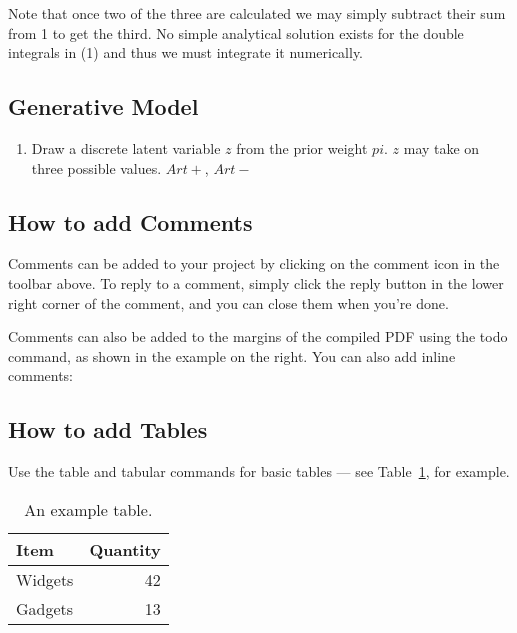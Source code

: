 \documentclass[a4paper]{article}
\begin{document}
Note that once two of the three are calculated we may simply subtract their sum from 1 to get the third. No simple analytical solution exists for the double integrals in (1) and thus we must integrate it numerically.

\subsection{Generative Model}

\begin{enumerate}
\item Draw a discrete latent variable $z$ from the prior weight $pi$. $z$ may take on three possible values. $Art+$, $Art-$
\end{enumerate}





\subsection{How to add Comments}

Comments can be added to your project by clicking on the comment icon in the toolbar above. %
%
%
To reply to a comment, simply click the reply button in the lower right corner of the comment, and you can close them when you're done.

Comments can also be added to the margins of the compiled PDF using the todo command, as shown in the example on the right. You can also add inline comments:


\subsection{How to add Tables}

Use the table and tabular commands for basic tables --- see Table~\ref{tab:widgets}, for example. 

\begin{table}
\centering
\begin{tabular}{l|r}
Item & Quantity \\\hline
Widgets & 42 \\
Gadgets & 13
\end{tabular}
\caption{\label{tab:widgets}An example table.}
\end{table}
\end{document}
